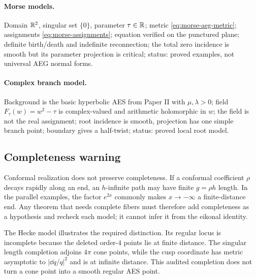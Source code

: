 \paragraph{Morse models.}
Domain $\mathbb{R}^2$, singular set $\{0\}$, parameter $\tau\in\mathbb{R}$; metric
\eqref{eq:morse-aeg-metric}; assignments \eqref{eq:morse-assignments}; equation
verified on the punctured plane; definite birth/death and indefinite reconnection;
the total zero incidence is smooth but its parameter projection is critical;
status: proved examples, not universal AEG normal forms.

\paragraph{Complex branch model.}
Background is the basic hyperbolic AES from Paper II with $\mu,\lambda>0$; field
$F_\tau(w)=w^2-\tau$ is complex-valued and arithmetic holomorphic in $w$; the
field is not the real assignment; root incidence is smooth, projection has one
simple branch point; boundary gives a half-twist; status: proved local root model.

\subsection{Completeness warning}

Conformal realization does not preserve completeness.  If a conformal coefficient
$\rho$ decays rapidly along an end, an $h$-infinite path may have finite
$g=\rho h$ length.  In the parallel examples, the factor $e^{2x}$ commonly makes
$x\to-\infty$ a finite-distance end.  Any theorem that needs complete fibers must
therefore add completeness as a hypothesis and recheck each model; it cannot infer
it from the eikonal identity.

The Hecke model illustrates the required distinction.  Its regular locus is
incomplete because the deleted order-$4$ points lie at finite distance.  The
singular length completion adjoins $4\pi$ cone points, while the cusp coordinate
has metric asymptotic to $|\dd q/q|^2$ and is at infinite distance.  This audited
completion does not turn a cone point into a smooth regular AES point.
